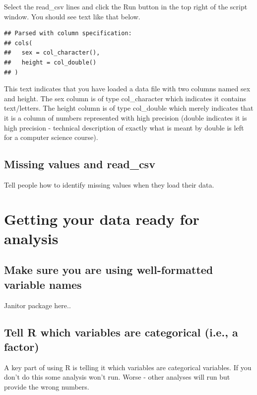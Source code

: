 \documentclass[
]{krantz}
\begin{document}
Select the read\_csv lines and click the Run button in the top right of the script window. You should see text like that below.

\begin{verbatim}
## Parsed with column specification:
## cols(
##   sex = col_character(),
##   height = col_double()
## )
\end{verbatim}

This text indicates that you have loaded a data file with two columns named sex and height. The sex column is of type col\_character which indicates it contains text/letters. The height column is of type col\_double which merely indicates that it is a column of numbers represented with high precision (double indicates it is high precision - technical description of exactly what is meant by double is left for a computer science course).

\hypertarget{missing-values-and-read_csv}{%
\subsection{Missing values and read\_csv}\label{missing-values-and-read_csv}}

Tell people how to identify missing values when they load their data.

\hypertarget{getting-your-data-ready-for-analysis}{%
\section{Getting your data ready for analysis}\label{getting-your-data-ready-for-analysis}}

\hypertarget{make-sure-you-are-using-well-formatted-variable-names}{%
\subsection{Make sure you are using well-formatted variable names}\label{make-sure-you-are-using-well-formatted-variable-names}}

Janitor package here..

\hypertarget{tell-r-which-variables-are-categorical-i.e.-a-factor}{%
\subsection{Tell R which variables are categorical (i.e., a factor)}\label{tell-r-which-variables-are-categorical-i.e.-a-factor}}

A key part of using R is telling it which variables are categorical variables. If you don't do this some analysis won't run. Worse - other analyses will run but provide the wrong numbers.
\end{document}
